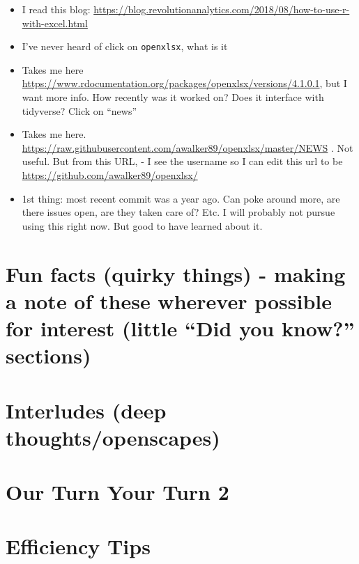 \documentclass[]{book}
\providecommand{\tightlist}{%
  \setlength{\itemsep}{0pt}\setlength{\parskip}{0pt}}
\begin{document}
\begin{itemize}
\tightlist
\item
  I read this blog: \url{https://blog.revolutionanalytics.com/2018/08/how-to-use-r-with-excel.html}
\item
  I've never heard of click on \texttt{openxlsx}, what is it
\item
  Takes me here \url{https://www.rdocumentation.org/packages/openxlsx/versions/4.1.0.1}, but I want more info. How recently was it worked on? Does it interface with tidyverse? Click on ``news''
\item
  Takes me here. \url{https://raw.githubusercontent.com/awalker89/openxlsx/master/NEWS} . Not useful. But from this URL, - I see the username so I can edit this url to be
  \url{https://github.com/awalker89/openxlsx/}
\item
  1st thing: most recent commit was a year ago. Can poke around more, are there issues open, are they taken care of? Etc. I will probably not pursue using this right now. But good to have learned about it.
\end{itemize}

\hypertarget{fun-facts-quirky-things---making-a-note-of-these-wherever-possible-for-interest-little-did-you-know-sections-1}{%
\section{Fun facts (quirky things) - making a note of these wherever possible for interest (little ``Did you know?'' sections)}\label{fun-facts-quirky-things---making-a-note-of-these-wherever-possible-for-interest-little-did-you-know-sections-1}}

\hypertarget{interludes-deep-thoughtsopenscapes-4}{%
\section{Interludes (deep thoughts/openscapes)}\label{interludes-deep-thoughtsopenscapes-4}}

\hypertarget{our-turn-your-turn-2-1}{%
\section{Our Turn Your Turn 2}\label{our-turn-your-turn-2-1}}

\hypertarget{efficiency-tips-5}{%
\section{Efficiency Tips}\label{efficiency-tips-5}}
\end{document}
